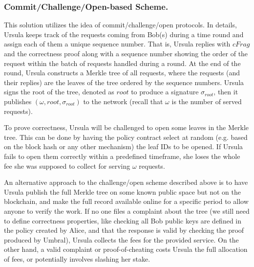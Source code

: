 \subsubsection{Commit/Challenge/Open-based Scheme.}
This solution utilizes the idea of commit/challenge/open protocols. 
In details, Ursula keeps track of the requests coming from Bob(s) 
during a time round and assign each of them a unique sequence 
number. That is, Ursula replies with $cFrag$ and the correctness proof 
along with a sequence number showing the order of the request within 
the batch of requests handled during a round. At the end of the round, 
Ursula constructs a Merkle tree of all requests, where 
the requests (and their replies) are the leaves of the tree ordered by the sequence
numbers. Ursula signs the root of the tree, denoted as $root$ to produce 
a signature $\sigma_{root}$, then it publishes $(\omega, root, \sigma_{root})$ 
to the network (recall that $\omega$ is the number of served requests). 


To prove correctness, Ursula will be challenged to open some leaves in the Merkle tree. 
This can be done by having the policy contract select at random (e.g. based
on the block hash or any other mechanism) the leaf IDs to be opened. If 
Ursula fails to open them correctly within a predefined timeframe, she loses the 
whole fee she was supposed to collect for serving $\omega$ requests.


An alternative approach to the challenge/open scheme described above is to 
have Ursula publish the full Merkle tree on some known public space but
not on the blockchain, and make the full record available online for a specific period
to allow anyone to verify the work. If no one files a complaint about the tree (we
still need to define correctness properties, like checking all Bob public keys are 
defined in the policy created by Alice, and that the response is valid by checking the 
proof produced by Umbral), Ursula collects the fees for the provided service. On the other
hand, a valid complaint or proof-of-cheating costs Ursula the full allocation of fees, or potentially involves slashing her stake.

